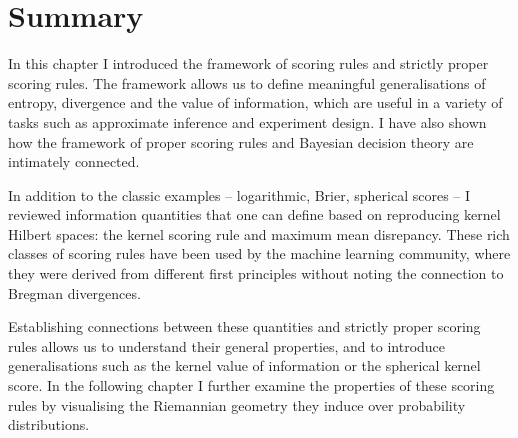 \section{Summary}

In this chapter I introduced the framework of scoring rules and strictly proper scoring rules. The framework allows us to define meaningful generalisations of entropy, divergence and the value of information, which are useful in a variety of tasks such as approximate inference and experiment design. I have also shown how the framework of proper scoring rules and Bayesian decision theory are intimately connected.

In addition to the classic examples -- logarithmic, Brier, spherical scores -- I reviewed information quantities that one can define based on reproducing kernel Hilbert spaces: the kernel scoring rule and maximum mean disrepancy. These rich classes of scoring rules have been used by the machine learning community, where they were derived from different first principles without noting the connection to Bregman divergences.

Establishing connections between these quantities and strictly proper scoring rules allows us to understand their general properties, and to introduce generalisations such as the kernel value of information or the spherical kernel score. In the following chapter I further examine the properties of these scoring rules by visualising the Riemannian geometry they induce over probability distributions.
